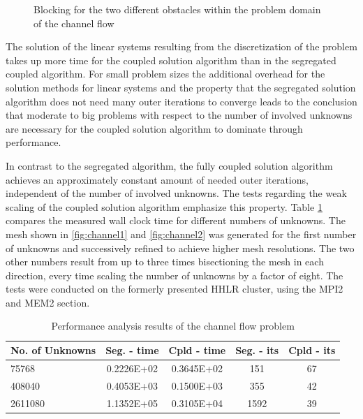 \begin{figure}
   \label{fig:cellvertex}
   \centering
    \qquad
    \caption{Blocking for the two different obstacles within the problem domain of the channel flow}
\end{figure}

The solution of the linear systems resulting from the discretization of the problem takes up more time for the coupled solution algorithm than in the segregated coupled algorithm. For small problem sizes the additional overhead for the solution methods for linear systems and the property that the segregated solution algorithm does not need many outer iterations to converge leads to the conclusion that moderate to big problems with respect to the number of involved unknowns are necessary for the coupled solution algorithm to dominate through performance. 

In contrast to the segregated algorithm, the fully coupled solution algorithm achieves an approximately constant amount of needed outer iterations, independent of the number of involved unknowns. The tests regarding the weak scaling of the coupled solution algorithm emphasize this property. Table \ref{tab:channelcompare} compares the measured wall clock time for different numbers of unknowns. The mesh shown in \ref{fig:channel1} and \ref{fig:channel2} was generated for the first number of unknowns and successively refined to achieve higher mesh resolutions. The two other numbers result from up to three times bisectioning the mesh in each direction, every time scaling the number of unknowns by a factor of eight. The tests were conducted on the formerly presented HHLR cluster, using the MPI2 and MEM2 section. 

\begin{table}[h!]\centering
{}
  \begin{tabular}{lcccc}\toprule
    No. of Unknowns & Seg. - time & Cpld - time & Seg. - its & Cpld - its \\
    \midrule
    \rowcolor{black!20} 75768    & 0.2226E+02 & 0.3645E+02 & 151  & 67 \\
    \rowcolor{black!00} 408040   & 0.4053E+03 & 0.1500E+03 & 355  & 42 \\
    \rowcolor{black!20} 2611080  & 1.1352E+05 & 0.3105E+04 & 1592 & 39 \\
  \end{tabular}
  \caption{Performance analysis results of the channel flow problem}
  \label{tab:channelcompare}
\end{table}

